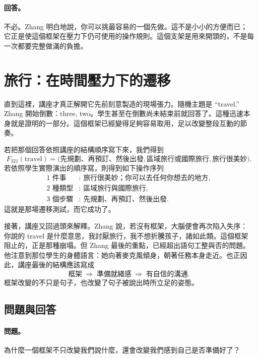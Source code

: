 \paragraph{回答。} 不必。Zhang 明白地說，你可以挑最容易的一個先做。這不是小小的方便而已；它正是使這個框架在壓力下仍可使用的操作規則。這個支架是用來開頭的，不是每一次都要完整做滿的負擔。

\section{旅行：在時間壓力下的遷移}

直到這裡，講座才真正解開它先前刻意製造的現場張力。隨機主題是 ``travel.'' Zhang 開始倒數：three, two。學生甚至在倒數尚未結束前就回答了。這種迅速本身就是證明的一部分。這個框架已經變得足夠容易取用，足以改變整段互動的節奏。

若把那個回答依照講座的結構順序寫下來，我們得到
\begin{equation}
F_{321}(\text{travel})
=
\bigl(
\text{先規劃、再預訂、然後出發},
\text{區域旅行或國際旅行},
\text{旅行很美妙}
\bigr).
\end{equation}
若依照學生實際演出的順序寫，則得到如下操作序列
\begin{align}
\text{1 件事} &:\ \text{旅行很美妙；你可以去任何你想去的地方},\\
\text{2 種類型} &:\ \text{區域旅行與國際旅行},\\
\text{3 個步驟} &:\ \text{先規劃、再預訂、然後出發}.
\end{align}
這就是那場遷移測試，而它成功了。

接著，講座又回過頭來解釋。Zhang 說，若沒有框架，大腦便會再次陷入失序：你說的 travel 是什麼意思，我討厭旅行，我不想折騰孩子，諸如此類。這個框架阻止的，正是那種崩塌。但 Zhang 最後的重點，已經超出語句工整與否的問題。他注意到那位學生的身體語言：她向著麥克風傾身，朝著任務本身走近。也正因此，講座最後的結構應該寫成
\begin{equation}
\text{框架}
\;\Rightarrow\;
\text{準備就緒感}
\;\Rightarrow\;
\text{有自信的溝通}.
\end{equation}
框架改變的不只是句子，也改變了句子被說出時所立足的姿態。

\subsection{問題與回答}

\paragraph{問題。} 為什麼一個框架不只改變我們說什麼，還會改變我們感到自己是否準備好了？

